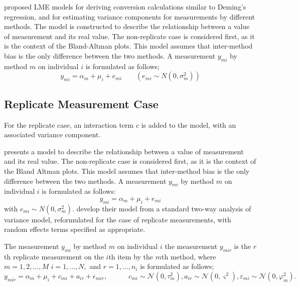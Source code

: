 \documentclass[12pt, a4paper]{report}
\theoremstyle{plain}
\theoremstyle{definition}
\theoremstyle{remark}
\begin{document}
\citet{BXC2004} proposed LME models for deriving conversion calculations similar to Deming's regression, and for
estimating variance components for measurements by different methods. The model is constructed to
describe the relationship between a value of measurement and its real value. The non-replicate case is considered first, as it is
the context of the Bland-Altman plots. This model assumes that inter-method bias is the only difference between the two methods.
A measurement $y_{mi}$ by method $m$ on individual $i$ is formulated as follows;
\begin{equation}
y_{mi}  = \alpha_{m} + \mu_{i} + e_{mi} \qquad ( e_{mi} \sim
N(0,\sigma^{2}_{m}))
\end{equation}

\subsection*{Replicate Measurement Case}

For the
replicate case, an interaction term $c$ is added to the model,
with an associated variance component. 

\citet{BXC2004} presents a model to describe the relationship between a value of measurement and its real value. The non-replicate case is considered first, as it is the context of the Bland Altman plots. This model assumes that inter-method bias is the only difference between the two methods. A measurement $y_{mi}$ by method $m$ on individual $i$ is formulated as follows:
\begin{equation}
y_{mi}  = \alpha_{m} + \mu_{i} + e_{mi} 
\end{equation}
with $ e_{mi} \sim N(0,\sigma^{2}_{m})$.
\citet{BXC2008} develop their model from a standard two-way analysis of variance model, reformulated for the case of replicate measurements, with random effects terms specified as appropriate. 



The measurement $y_{mi}$ by method $m$ on individual $i$ the measurement $y_{mir} $ is the $r$th replicate measurement on the $i$th item by the $m$th method, where $m=1,2,\ldots,M$ $i=1,\ldots,N,$ and $r = 1,\ldots,n_i$ is formulated as follows;
\begin{equation}
y_{mir}  = \alpha_{m} + \mu_{i} + c_{mi} + a_{ir} + \epsilon_{mir}, \qquad \quad c_{mi} \sim \mathcal{N}(0,\tau^{2}_{m}) , a_{ir} \sim \mathcal{N}(0,\varsigma^{2}),  \varepsilon_{mi} \sim \mathcal{N}(0,\varphi^{2}_{m}) .
\end{equation}
\end{document}
